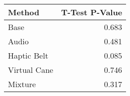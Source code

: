 
\centering
\begin{tabular}{lr}
\toprule
      Method &  T-Test P-Value \\
\midrule
        Base &           0.683 \\
       Audio &           0.481 \\
 Haptic Belt &           0.085 \\
Virtual Cane &           0.746 \\
     Mixture &           0.317 \\
\bottomrule
\end{tabular}
